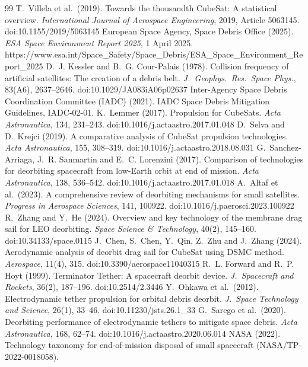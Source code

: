 \documentclass[11pt,a4paper]{article}
\begin{document}
\nocite{forshaw,biddy}
\begin{thebibliography}{99}\small
{} T.~Villela et al.\ (2019). Towards the thousandth CubeSat: A statistical overview. \emph{International Journal of Aerospace Engineering}, 2019, Article 5063145. doi:10.1155/2019/5063145
 European Space Agency, Space Debris Office (2025). \emph{ESA Space Environment Report 2025}, 1 April 2025. https://www.esa.int/Space\_Safety/Space\_Debris/ESA\_Space\_Environment\_Report\_2025
 D.~J. Kessler and B.~G. Cour-Palais (1978). Collision frequency of artificial satellites: The creation of a debris belt. \emph{J.\ Geophys.\ Res.\ Space Phys.}, 83(A6), 2637--2646. doi:10.1029/JA083iA06p02637
 Inter-Agency Space Debris Coordination Committee (IADC) (2021). IADC Space Debris Mitigation Guidelines, IADC-02-01.
 K.~Lemmer (2017). Propulsion for CubeSats. \emph{Acta Astronautica}, 134, 231--243. doi:10.1016/j.actaastro.2017.01.048
 D.~Selva and D.~Krejci (2019). A comparative analysis of CubeSat propulsion technologies. \emph{Acta Astronautica}, 155, 308--319. doi:10.1016/j.actaastro.2018.08.031
 G.~Sanchez-Arriaga, J.~R. Sanmartin and E.~C. Lorenzini (2017). Comparison of technologies for deorbiting spacecraft from low-Earth orbit at end of mission. \emph{Acta Astronautica}, 138, 536--542. doi:10.1016/j.actaastro.2017.01.018
 A.~Altaf et al.\ (2023). A comprehensive review of deorbiting mechanisms for small satellites. \emph{Progress in Aerospace Sciences}, 141, 100922. doi:10.1016/j.paerosci.2023.100922
 R.~Zhang and Y.~He (2024). Overview and key technology of the membrane drag sail for LEO deorbiting. \emph{Space Science \& Technology}, 40(2), 145--160. doi:10.34133/space.0115
 J.~Chen, S.~Chen, Y.~Qin, Z.~Zhu and J.~Zhang (2024). Aerodynamic analysis of deorbit drag sail for CubeSat using DSMC method. \emph{Aerospace}, 11(4), 315. doi:10.3390/aerospace11040315
 R.~L. Forward and R.~P. Hoyt (1999). Terminator Tether: A spacecraft deorbit device. \emph{J.\ Spacecraft and Rockets}, 36(2), 187--196. doi:10.2514/2.3446
 Y.~Ohkawa et al.\ (2012). Electrodynamic tether propulsion for orbital debris deorbit. \emph{J.\ Space Technology and Science}, 26(1), 33--46. doi:10.11230/jsts.26.1\_33
 G.~Sarego et al.\ (2020). Deorbiting performance of electrodynamic tethers to mitigate space debris. \emph{Acta Astronautica}, 168, 62--74. doi:10.1016/j.actaastro.2020.06.014
 NASA (2022). Technology taxonomy for end-of-mission disposal of small spacecraft (NASA/TP-2022-0018058).

\end{thebibliography}
\end{document}
